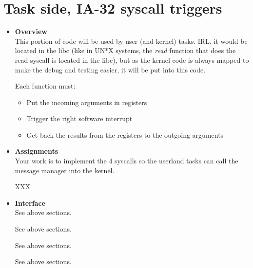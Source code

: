 \section{Task side, \textbf{IA-32 syscall triggers}}
\begin{itemize}
  \item {\bf Overview}\\

    This portion of code will be used by user (and kernel) tasks. IRL,
    it would be located in the libc (like in UN*X systems, the
    \emph{read} function that does the read syscall is located in the
    libc), but as the kernel code is always mapped to make the debug
    and testing easier, it will be put into this code.

    Each function must:

    \begin{itemize}
      \item
	Put the incoming arguments in registers
      \item
	Trigger the right software interrupt
      \item
	Get back the results from the registers to the outgoing arguments
    \end{itemize}

  \item {\bf Assignments}\\

    Your work is to implement the 4 syscalls so the userland tasks can
    call the message manager into the kernel.

    XXX

  \item {\bf Interface}\\

	 {
	   See above sections.
	 }

	 {
	   See above sections.
	 }

	 {
	   See above sections.
	 }

	 {
	   See above sections.
	 }


\end{itemize}
